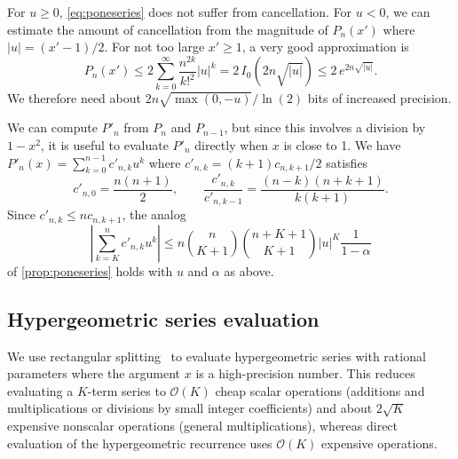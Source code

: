 \documentclass[nohypdvips,review]{siamart0216}
\newcommand{\OO}{\mathcal{O}}
\begin{document}
For $u \ge 0$, \cref{eq:poneseries} does not suffer from cancellation.
For $u < 0$, we can estimate the amount of
cancellation from the magnitude of $P_n(x')$ where $|u| = (x'-1)/2$.
For not too large $x' \ge 1$, a very good approximation is
\[ P_n(x') \leq 2 \sum_{k=0}^{\infty} \frac{n^{2k}}{k!^2} |u|^k
           = 2\,I_0(2n\sqrt{|u|})
           \leq 2\,e^{2n\sqrt{|u|}}. \]
We therefore need about $2n\sqrt{\max(0,-u)} / \ln(2)$ bits
of increased precision.

We can compute $P'_n$ from $P_n$ and $P_{n-1}$, but since this
involves a division by $1-x^2$, it is useful to
evaluate $P'_n$ directly when $x$ is close to 1.
We have
$P'_n(x) = \sum_{k=0}^{n-1} c'_{n,k} u^k$
where $c'_{n,k} = (k+1) c_{n,k+1} / 2$ satisfies
\begin{equation}
\label{eq:ponerecprime}
  c'_{n,0} = \frac{n(n+1)}{2}, \qquad
  \frac{c'_{n,k}}{c'_{n,k-1}} = \frac{(n-k)(n+k+1)}{k(k+1)}.
\end{equation}
Since $c'_{n,k} \le n c_{n,k+1}$, the analog
\begin{equation}
\label{eq:truncerr2b}
\left| \sum_{k=K}^n c'_{n,k} u^k \right| \le n {n \choose K+1}{n+K+1 \choose K+1} |u|^K \frac{1}{1-\alpha}
\end{equation}
of \cref{prop:poneseries} holds with $u$ and $\alpha$ as above.

\subsection{Hypergeometric series evaluation}

\label{sec:serieseval}

We use rectangular splitting~\cite{Smith1989,Johansson2014rectangular}
to evaluate hypergeometric series with
rational parameters where the argument $x$ is a high-precision number.
This reduces evaluating a $K$-term series to
$\OO(K)$ cheap scalar operations (additions and multiplications or divisions
by small integer coefficients)
and about $2\sqrt{K}$ expensive nonscalar operations (general multiplications),
whereas direct evaluation of the hypergeometric
recurrence uses $\OO(K)$ expensive operations.
\end{document}
